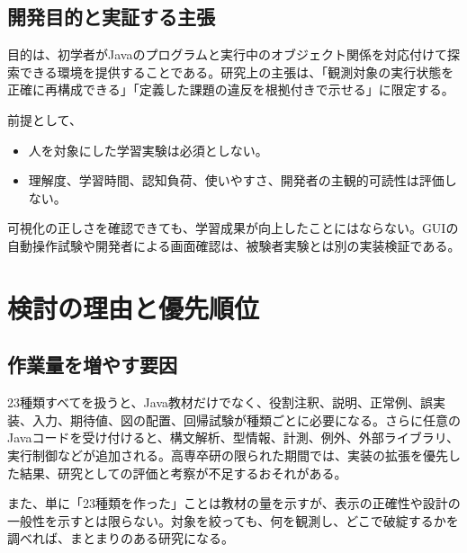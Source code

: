 \documentclass[a4paper,11pt]{ltjsarticle}
\begin{document}
\subsection{開発目的と実証する主張}
目的は、初学者がJavaのプログラムと実行中のオブジェクト関係を対応付けて探索できる環境を提供することである。研究上の主張は、「観測対象の実行状態を正確に再構成できる」「定義した課題の違反を根拠付きで示せる」に限定する。

前提として、
\begin{itemize}
	\item 人を対象にした学習実験は必須としない。
	\item 理解度、学習時間、認知負荷、使いやすさ、開発者の主観的可読性は評価しない。
\end{itemize}
可視化の正しさを確認できても、学習成果が向上したことにはならない。GUIの自動操作試験や開発者による画面確認は、被験者実験とは別の実装検証である。
\clearpage

\section{検討の理由と優先順位}
\subsection{作業量を増やす要因}
23種類すべてを扱うと、Java教材だけでなく、役割注釈、説明、正常例、誤実装、入力、期待値、図の配置、回帰試験が種類ごとに必要になる。さらに任意のJavaコードを受け付けると、構文解析、型情報、計測、例外、外部ライブラリ、実行制御などが追加される。高専卒研の限られた期間では、実装の拡張を優先した結果、研究としての評価と考察が不足するおそれがある。

また、単に「23種類を作った」ことは教材の量を示すが、表示の正確性や設計の一般性を示すとは限らない。対象を絞っても、何を観測し、どこで破綻するかを調べれば、まとまりのある研究になる。
\end{document}
